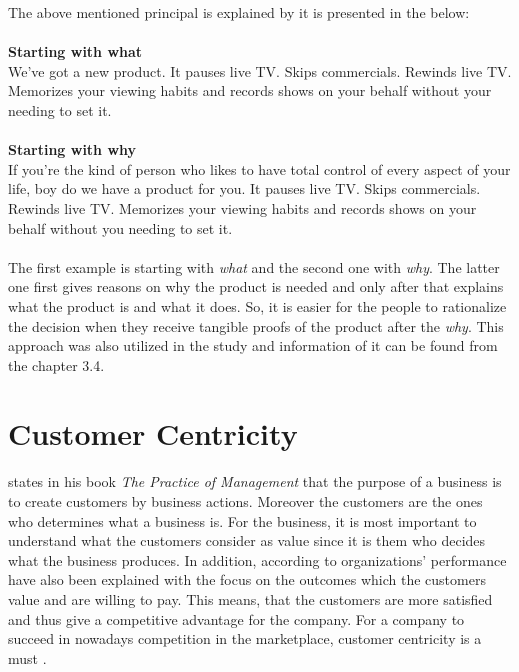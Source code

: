 The above mentioned principal is explained by \textcite{Sinek:2009} it is presented in the below:\\\\
\textbf{Starting with what}\\
We've got a new product.\newline
It pauses live TV.\newline
Skips commercials.\newline
Rewinds live TV.\newline
Memorizes your viewing habits and records shows on your behalf without your needing to set it.
\\\\
\textbf{Starting with why}\\
If you're the kind of person who likes to have total control of every aspect of your life, boy do we have a product for you.\newline
It pauses live TV.\newline
Skips commercials.\newline
Rewinds live TV.\newline
Memorizes your viewing habits and records shows on your behalf
without you needing to set it.\\\\
The first example is starting with \emph{what} and the second one with \emph{why}. The latter one first gives reasons on why the product is needed and only after that explains what the product is and what it does. So, it is easier for the people to rationalize the decision when they receive tangible proofs of the product after the \emph{why}. This approach was also utilized in the study and information of it can be found from the chapter 3.4.


\section{Customer Centricity}

\textcite{Drucker:2007} states in his book \emph{The Practice of Management} that the purpose of a business is to create customers by business actions. Moreover the customers are the ones who determines what a business is. For the business, it is most important to understand what the customers consider as value since it is them who decides what the business produces. In addition, according to \textcite{Parniangtong:2017} organizations' performance have also been explained with the focus on the outcomes which the customers value and are willing to pay. This means, that the customers are more satisfied and thus give a competitive advantage for the company. For a company to succeed in nowadays competition in the marketplace, customer centricity is a must \parencite{PathToCustomerCentricity:2006}.


